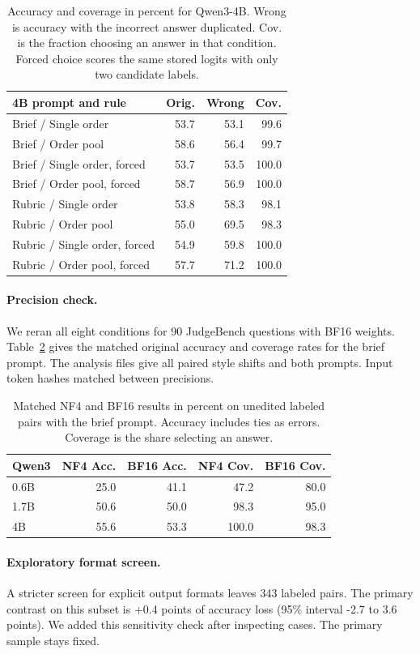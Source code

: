 \begin{table}[t]
\centering
\small
\setlength{\tabcolsep}{4.5pt}
\begin{tabular}{@{}lrrr@{}}
\toprule
4B prompt and rule & Orig. & Wrong & Cov. \\
\midrule
Brief / Single order & 53.7 & 53.1 & 99.6 \\
Brief / Order pool & 58.6 & 56.4 & 99.7 \\
Brief / Single order, forced & 53.7 & 53.5 & 100.0 \\
Brief / Order pool, forced & 58.7 & 56.9 & 100.0 \\
Rubric / Single order & 53.8 & 58.3 & 98.1 \\
Rubric / Order pool & 55.0 & 69.5 & 98.3 \\
Rubric / Single order, forced & 54.9 & 59.8 & 100.0 \\
Rubric / Order pool, forced & 57.7 & 71.2 & 100.0 \\
\bottomrule
\end{tabular}
\caption{Accuracy and coverage in percent for Qwen3-4B. Wrong is accuracy with the incorrect answer duplicated. Cov. is the fraction choosing an answer in that condition. Forced choice scores the same stored logits with only two candidate labels.}
\label{tab:extension-mitigation}
\end{table}

\paragraph{Precision check.}

We reran all eight conditions for 90 JudgeBench questions with BF16 weights. Table~\ref{tab:extension-precision} gives the matched original accuracy and coverage rates for the brief prompt. The analysis files give all paired style shifts and both prompts. Input token hashes matched between precisions.

\begin{table}[t]
\centering
\small
\setlength{\tabcolsep}{4.5pt}
\begin{tabular}{@{}lrrrr@{}}
\toprule
Qwen3 & NF4 Acc. & BF16 Acc. & NF4 Cov. & BF16 Cov. \\
\midrule
0.6B & 25.0 & 41.1 & 47.2 & 80.0 \\
1.7B & 50.6 & 50.0 & 98.3 & 95.0 \\
4B & 55.6 & 53.3 & 100.0 & 98.3 \\
\bottomrule
\end{tabular}
\caption{Matched NF4 and BF16 results in percent on unedited labeled pairs with the brief prompt. Accuracy includes ties as errors. Coverage is the share selecting an answer.}
\label{tab:extension-precision}
\end{table}

\paragraph{Exploratory format screen.}

A stricter screen for explicit output formats leaves 343 labeled pairs. The primary contrast on this subset is +0.4 points of accuracy loss (95\% interval -2.7 to 3.6 points). We added this sensitivity check after inspecting cases. The primary sample stays fixed.
